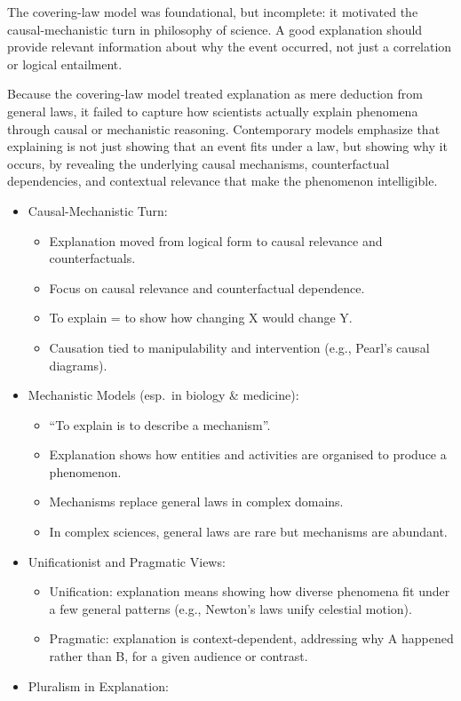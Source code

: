 \documentclass[
  12pt,
]{book}
\providecommand{\tightlist}{%
  \setlength{\itemsep}{0pt}\setlength{\parskip}{0pt}}
\begin{document}
The covering-law model was foundational, but incomplete: it motivated the causal-mechanistic turn in philosophy of science. A good explanation should provide relevant information about why the event occurred, not just a correlation or logical entailment.

Because the covering-law model treated explanation as mere deduction from general laws, it failed to capture how scientists actually explain phenomena through causal or mechanistic reasoning. Contemporary models emphasize that explaining is not just showing that an event fits under a law, but showing why it occurs, by revealing the underlying causal mechanisms, counterfactual dependencies, and contextual relevance that make the phenomenon intelligible.

\begin{itemize}
\tightlist
\item
  Causal-Mechanistic Turn:

  \begin{itemize}
  \tightlist
  \item
    Explanation moved from logical form to causal relevance and counterfactuals.
  \item
    Focus on causal relevance and counterfactual dependence.
  \item
    To explain = to show how changing X would change Y.
  \item
    Causation tied to manipulability and intervention (e.g., Pearl's causal diagrams).
  \end{itemize}
\item
  Mechanistic Models (esp.~in biology \& medicine):

  \begin{itemize}
  \tightlist
  \item
    ``To explain is to describe a mechanism''.
  \item
    Explanation shows how entities and activities are organised to produce a phenomenon.
  \item
    Mechanisms replace general laws in complex domains.
  \item
    In complex sciences, general laws are rare but mechanisms are abundant.
  \end{itemize}
\item
  Unificationist and Pragmatic Views:

  \begin{itemize}
  \tightlist
  \item
    Unification: explanation means showing how diverse phenomena fit under a few general patterns (e.g., Newton's laws unify celestial motion).
  \item
    Pragmatic: explanation is context-dependent, addressing why A happened rather than B, for a given audience or contrast.
  \end{itemize}
\item
  Pluralism in Explanation:


\end{itemize}
\end{document}
